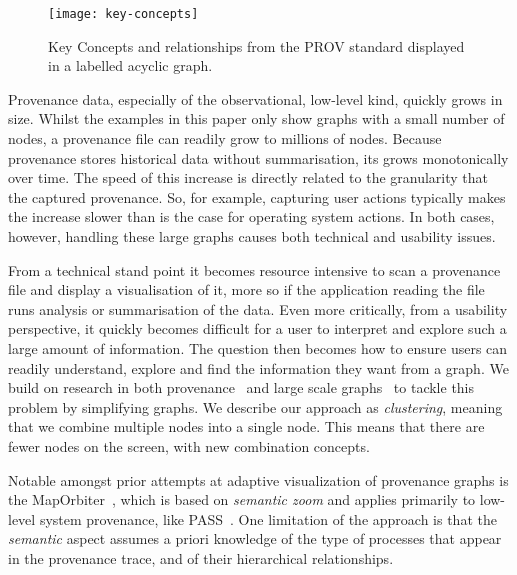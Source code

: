 \begin{figure}[h]
	\centering
	\texttt{[image: key-concepts]}
	\caption{Key Concepts and relationships from the PROV standard displayed in a labelled acyclic graph.}
	\label{fig:key-concepts}
\end{figure}

Provenance data, especially of the observational, low-level kind, quickly grows in size. Whilst the examples in this paper only show graphs with a small number of nodes, a provenance file can readily grow to millions of nodes. Because provenance stores historical data without summarisation, its grows monotonically over time. The speed of this increase is directly related to the granularity that the captured provenance. So, for example, capturing user actions typically makes the increase slower than is the case for operating system actions. In both cases, however, handling these large graphs causes both technical and usability issues. 

From a technical stand point it becomes resource intensive to scan a provenance file and display a visualisation of it, more so if the application reading the file runs analysis or summarisation of the data. 
%
Even more critically, from a usability perspective, it quickly becomes difficult for a user to interpret and explore such a large amount of information. The question then becomes how to ensure 
users can readily understand, explore and find the information they want from a graph. 
We build on research in both provenance~\cite{Seltzer2011, Borkin2013} 
and large scale graphs~\cite{Schaffer1996, Abello2006} 
to tackle this problem by simplifying graphs.
We describe our approach as \emph{clustering}, meaning that we combine multiple nodes into a single node.
This means that there are fewer nodes on the screen, with new combination concepts.

Notable amongst prior attempts at adaptive visualization of provenance graphs is the MapOrbiter~\cite{Macko2011a}, which is based on \textit{semantic zoom} and applies primarily to low-level system provenance, like PASS~\cite{Macko2011}.  One limitation of the approach is that the \textit{semantic} aspect assumes a priori knowledge of the type of processes that appear in the provenance trace,  and of their hierarchical relationships.


